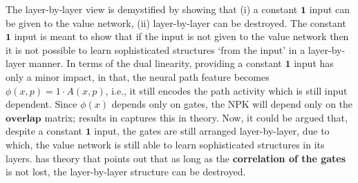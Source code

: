 The layer-by-layer view is demystified by showing that (i) a constant $\mathbf{1}$ input can be given to the value network, (ii) layer-by-layer can be destroyed. The constant $\mathbf{1}$ input is meant to show that if the input is not given to the value network then it is not possible to learn sophisticated structures `from the input' in a layer-by-layer manner.  In terms of the dual linearity, providing a constant $\mathbf{1}$ input has only a minor impact, in that, the neural path feature becomes $\phi(x,p)=1\cdot A(x,p)$, i.e., it still encodes the path activity which is still input dependent. Since $\phi(x)$ depends only on gates, the NPK will depend only on the $\textbf{overlap}$ matrix; results in   captures this in theory. Now, it could be argued that, despite a constant $\mathbf{1}$ input, the gates are still arranged layer-by-layer, due to which, the value network is still able to learn sophisticated structures in its layers.  has theory that points out that as long as the \textbf{correlation of the gates} is not lost, the layer-by-layer structure can be destroyed.
% 

